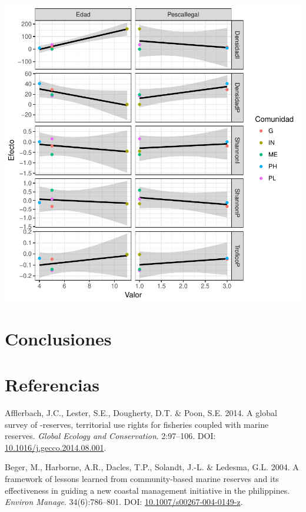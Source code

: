 \documentclass[12pt,]{article}
\begin{document}
\includegraphics{Manuscript_files/figure-latex/unnamed-chunk-13-1.pdf}

\section{Conclusiones}\label{conclusiones}

\section*{Referencias}\label{referencias}

\hypertarget{refs}{}
\hypertarget{ref-afflerbach_2014-HP}{}
Afflerbach, J.C., Lester, S.E., Dougherty, D.T. \& Poon, S.E. 2014. A
global survey of -reserves, territorial use rights for fisheries coupled
with marine reserves. \emph{Global Ecology and Conservation}. 2:97--106.
DOI:
\href{https://doi.org/10.1016/j.gecco.2014.08.001}{10.1016/j.gecco.2014.08.001}.

\hypertarget{ref-beger_2004-Y8}{}
Beger, M., Harborne, A.R., Dacles, T.P., Solandt, J.-L. \& Ledesma, G.L.
2004. A framework of lessons learned from community-based marine
reserves and its effectiveness in guiding a new coastal management
initiative in the philippines. \emph{Environ Manage}. 34(6):786--801.
DOI:
\href{https://doi.org/10.1007/s00267-004-0149-z}{10.1007/s00267-004-0149-z}.
\end{document}
